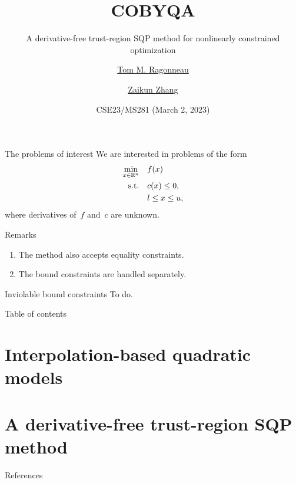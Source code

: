 \documentclass{presentation}
\title{COBYQA}
\subtitle{A derivative-free trust-region SQP method for nonlinearly constrained optimization}
\date{CSE23/MS281 (March 2, 2023)}
\author{\href{https://www.tomragonneau.com/}{Tom M. Ragonneau} \and \href{https://www.zhangzk.net/}{Zaikun Zhang}}
\institute{
    Department of Applied Mathematics\\ 
    The Hong Kong Polytechnic University
}
\begin{document}
\maketitle

\begin{frame}{The problems of interest}
    We are interested in problems of the form
    \begin{align*}
        \min_{x \in \mathbb{R}^n}   & \quad f(x)\\
        \mathrm{s.t.}       & \quad c(x) \le 0,\\
                            & \quad l \le x \le u,
    \end{align*}
    where derivatives of~$f$ and~$c$ are \alert{unknown}.

    \begin{block}{Remarks}
        \begin{enumerate}
            \item The method also accepts \alert{equality constraints}.
            \item The bound constraints are handled separately.
        \end{enumerate}
    \end{block}
\end{frame}

\begin{frame}{Inviolable bound constraints}
    To do.
\end{frame}

\begin{frame}{Table of contents}
    \tableofcontents[hideallsubsections]
\end{frame}

\section{Interpolation-based quadratic models}

\section{A derivative-free trust-region SQP method}

\appendix

\begin{frame}[t,allowframebreaks]{References}
    \nocite{Ragonneau_2022}
    \printbibliography[heading=none]
\end{frame}
\end{document}
